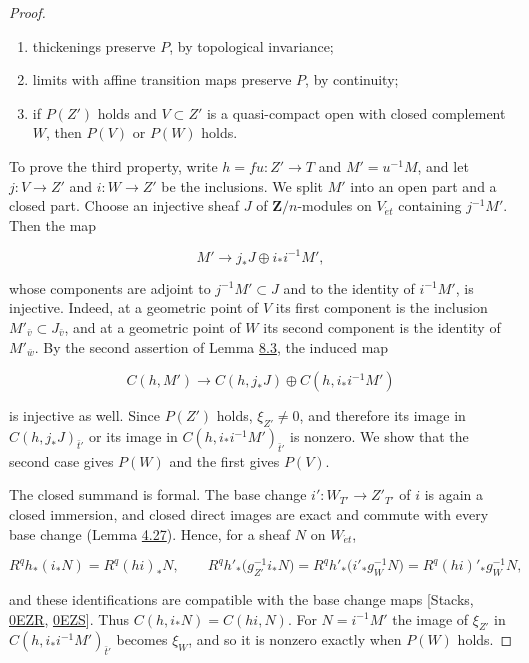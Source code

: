 \documentclass[11pt]{article}
\begin{document}
\begin{proof}[{Proof}]
\begin{enumerate}
\item thickenings preserve \(P\), by topological invariance;
\item limits with affine transition maps preserve \(P\), by continuity;
\item if \(P(Z')\) holds and \(V\subset Z'\) is a quasi-compact open with closed complement \(W\), then \(P(V)\) or \(P(W)\) holds.
\end{enumerate}

To prove the third property, write \(h=fu:Z'\to T\) and \(M'=u^{-1}M\), and let \(j:V\to Z'\) and \(i:W\to Z'\) be the inclusions. We split \(M'\) into an open part and a closed part. Choose an injective sheaf \(J\) of \(\mathbf Z/n\)-modules on \(V_{\acute{e}t}\) containing \(j^{-1}M'\). Then the map

\[
M'\longrightarrow j_*J\oplus i_*i^{-1}M',
\]

whose components are adjoint to \(j^{-1}M'\subset J\) and to the identity of \(i^{-1}M'\), is injective. Indeed, at a geometric point of \(V\) its first component is the inclusion \(M'_{\bar v}\subset J_{\bar v}\), and at a geometric point of \(W\) its second component is the identity of \(M'_{\bar w}\). By the second assertion of Lemma \hyperref[bp653]{8.3}, the induced map

\[
C(h,M')\longrightarrow C(h,j_*J)\oplus C(h,i_*i^{-1}M')
\]

is injective as well. Since \(P(Z')\) holds, \(\xi_{Z'}\neq0\), and therefore its image in \(C(h,j_*J)_{\bar t'}\) or its image in \(C(h,i_*i^{-1}M')_{\bar t'}\) is nonzero. We show that the second case gives \(P(W)\) and the first gives \(P(V)\).

The closed summand is formal. The base change \(i':W_{T'}\to Z'_{T'}\) of \(i\) is again a closed immersion, and closed direct images are exact and commute with every base change (Lemma \hyperref[bp364]{4.27}). Hence, for a sheaf \(N\) on \(W_{\acute{e}t}\),

\[
R^qh_*(i_*N)=R^q(hi)_*N,
\qquad
R^qh'_*\bigl(g_{Z'}^{-1}i_*N\bigr)=R^qh'_*\bigl(i'_*g_W^{-1}N\bigr)
=R^q(hi)'_*g_W^{-1}N,
\]

and these identifications are compatible with the base change maps [Stacks, \href{https://stacks.math.columbia.edu/tag/0EZR}{0EZR}, \href{https://stacks.math.columbia.edu/tag/0EZS}{0EZS}]. Thus \(C(h,i_*N)=C(hi,N)\). For \(N=i^{-1}M'\) the image of \(\xi_{Z'}\) in \(C(h,i_*i^{-1}M')_{\bar t'}\) becomes \(\xi_W\), and so it is nonzero exactly when \(P(W)\) holds.


\end{proof}
\end{document}
